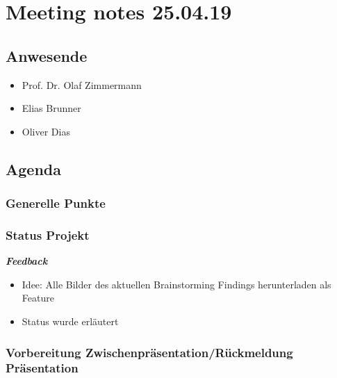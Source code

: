 \hypertarget{meeting-notes-250419}{%
\section*{Meeting notes 25.04.19}\label{meeting-notes-250419}}

\hypertarget{anwesende}{%
\subsection*{Anwesende}\label{anwesende}}

\begin{itemize}
\item
  Prof. Dr. Olaf Zimmermann
\item
  Elias Brunner
\item
  Oliver Dias
\end{itemize}

\hypertarget{agenda}{%
\subsection*{Agenda}\label{agenda}}

\hypertarget{generelle-punkte}{%
\subsubsection*{Generelle Punkte}\label{generelle-punkte}}

\hypertarget{status-projekt}{%
\subsubsection*{Status Projekt}\label{status-projekt}}

\emph{\textbf{Feedback}}

\begin{itemize}
\item Idee: Alle Bilder des aktuellen Brainstorming Findings herunterladen als Feature
\item Status wurde erläutert
\end{itemize}

\hypertarget{vorbereitung-zwischenpruxe4sentationruxfcckmeldung-pruxe4sentation}{%
\subsubsection*{Vorbereitung Zwischenpräsentation/Rückmeldung
Präsentation}\label{vorbereitung-zwischenpruxe4sentationruxfcckmeldung-pruxe4sentation}}


